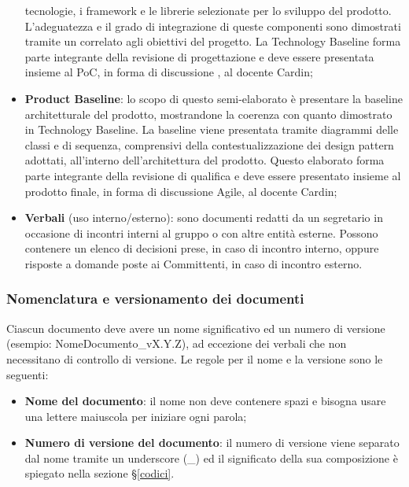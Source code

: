 \begin{itemize}
                    tecnologie, i framework e le librerie selezionate per lo sviluppo del prodotto. 
                    L'adeguatezza e il grado di integrazione di queste componenti sono dimostrati 
                    tramite un  correlato agli obiettivi del progetto. 
                    La Technology Baseline forma parte integrante della revisione di progettazione e 
                    deve essere presentata insieme al PoC, in forma di discussione , 
                    al docente Cardin;
                    \item \textbf{Product Baseline}: lo scopo di questo semi-elaborato è presentare la 
                    baseline architetturale del prodotto, mostrandone la coerenza con quanto dimostrato 
                    in Technology Baseline. La baseline viene presentata tramite diagrammi delle classi 
                    e di sequenza, comprensivi della contestualizzazione dei design pattern adottati, 
                    all'interno dell'architettura del prodotto. 
                    Questo elaborato forma parte integrante della revisione di qualifica e deve essere
                    presentato insieme al prodotto finale, in forma di discussione Agile, al docente Cardin;
                    \item \textbf{Verbali} (uso interno/esterno):  sono documenti redatti da un segretario 
                    in occasione di incontri interni al gruppo o con altre entità esterne.
                    Possono contenere un elenco di decisioni prese, in caso di incontro interno, oppure
                    risposte a domande poste ai Committenti, in caso di incontro esterno.
                \end{itemize}

		\subsubsection{Nomenclatura e versionamento dei documenti} \label{formatoFile}

			Ciascun documento deve avere un nome significativo ed un numero di versione (esempio:
			NomeDocumento\_vX.Y.Z), ad eccezione dei verbali che non necessitano di controllo di 
			versione. 
			Le regole per il nome e la versione sono le seguenti:

                \begin{itemize}
                    \item \textbf{Nome del documento}: il nome non deve contenere spazi e bisogna usare
                    una lettere maiuscola per iniziare ogni parola;
                    \item \textbf{Numero di versione del documento}: il numero di versione viene separato
                    dal nome tramite un underscore (\_) ed il significato della sua composizione è
                    spiegato nella sezione §\ref{codici}.
                \end{itemize}

